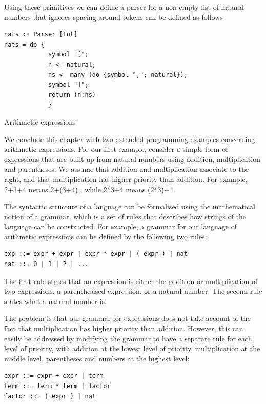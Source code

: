 \documentclass[a4papert]{article}
\begin{document}
Using these primitives we can define a parser for a non-empty list of natural numbers that ignores spacing around tokens can be defined as follows

\begin{lstlisting}[style=haskellstyle]
nats :: Parser [Int]
nats = do {
            symbol "[";
            n <- natural;
            ns <- many (do {symbol ","; natural});
            symbol "]";
            return (n:ns)
            }

\end{lstlisting}
Arithmetic expressions

We conclude this chapter with two extended programming examples concerning arithmetic expressions. For our first example, consider a simple form of expressions that are built up from natural numbers using addition, multiplication and parentheses. We assume that addition and multiplication associate to the right, and that multiplication has higher priority than addition. For example, 2+3+4 means 2+(3+4) , while 2*3+4 means (2*3)+4

The syntactic structure of a language can be formalised using the mathematical notion of a grammar, which is a set of rules that describes how strings of the language can be constructed. For example, a grammar for out language of arithmetic expressions can be defined by the following two rules:


\begin{lstlisting}[style=haskellstyle]
exp ::= expr + expr | expr * expr | ( expr ) | nat
nat ::= 0 | 1 | 2 | ...
\end{lstlisting}




The first rule states that an expression is either the addition or multiplication of two expressions, a parenthesised expression, or a natural number. The second rule states what a natural number is.


The problem is that our grammar for expressions does not take account of the fact that multiplication has higher priority than addition. However, this can easily be addressed by modifying the grammar to have a separate rule for each level of priority, with addition at the lowest level of priority, multiplication at the middle level, parentheses and numbers at the highest level:


\begin{lstlisting}[style=haskellstyle]
expr ::= expr + expr | term
term ::= term * term | factor
factor ::= ( expr ) | nat
\end{lstlisting}
\end{document}
